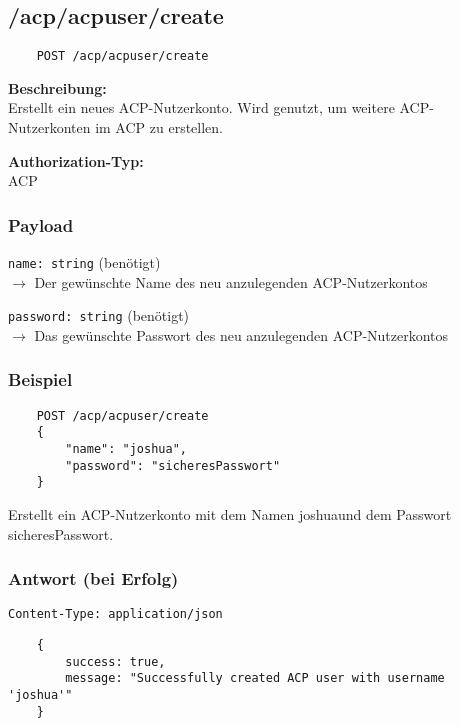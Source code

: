 \subsection{/acp/acpuser/create}

\begin{lstlisting}
    POST /acp/acpuser/create
\end{lstlisting}

\textbf{Beschreibung:} \\
Erstellt ein neues ACP-Nutzerkonto. Wird genutzt, um weitere ACP-Nutzerkonten im ACP zu erstellen.

\textbf{Authorization-Typ:} \\
ACP

\subsubsection{Payload}

\lstinline{name: string} (benötigt) \\
$\rightarrow$ Der gewünschte Name des neu anzulegenden ACP-Nutzerkontos

\lstinline{password: string} (benötigt) \\
$\rightarrow$ Das gewünschte Passwort des neu anzulegenden ACP-Nutzerkontos

\subsubsection{Beispiel}

\begin{lstlisting}
    POST /acp/acpuser/create
    {
        "name": "joshua",
        "password": "sicheresPasswort"
    }
\end{lstlisting}

Erstellt ein ACP-Nutzerkonto mit dem Namen \glqq joshua\grqq und dem Passwort \glqq sicheresPasswort\grqq.

\subsubsection{Antwort (bei Erfolg)}

\lstinline{Content-Type: application/json}
\begin{lstlisting}
    {
        success: true, 
        message: "Successfully created ACP user with username 'joshua'"
    }
\end{lstlisting}